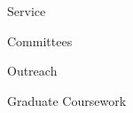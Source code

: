 \documentclass [11pt,letterpaper]{article}
\begin{document}
%
%
\begin{rSection}{\textrm{Service}}

\end{rSection}
\begin{rSection}{\textrm{Committees}}

\end{rSection}
%
\begin{rSection}{\textrm{Outreach}}

\end{rSection}
\begin{rSection}{\textrm{Graduate Coursework}}

\begin{comment}

\end{comment}
\end{rSection}
\begin{comment}
\begin{rSection}{\textrm{Development}}

\end{rSection}
\end{comment}
\end{document}
